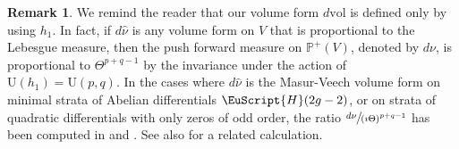 \documentclass[JEP,XML,SOM,Unicode]{cedram}
\let\mathcal\EuScript
\theoremstyle{plain}
\theoremstyle{definition}
\newtheorem{Remark}[Theorem]{Remark}
\newcommand{\Pb}{\mathbb{P}}
\newcommand{\cH}{\mathcal{H}}
\newcommand{\vol}{\mathrm{vol}}
\newcommand{\Ur}{\mathrm{U}}
\begin{document}
\begin{Remark}\label{rk:push:meas:n:curvature}
We remind the reader that our volume form $d\vol$ is defined only by using $h_1$.
In fact, if $d\hat{\nu}$ is any volume form on $V$ that is proportional to the Lebesgue measure, then the push forward measure on $\Pb^+(V)$, denoted by $d\nu$, is proportional to $\Theta^{p+q-1}$ by the invariance under the action of $\Ur(h_1)=\Ur(p,q)$.
In the cases where $d\hat{\nu}$ is the Masur-Veech volume form on minimal strata of Abelian differentials $\cH(2g-2)$, or on strata of quadratic differentials with only zeros of odd order, the ratio $\sfrac{d\nu}{(\imath\Theta)^{p+q-1}}$ has been computed in \cite{Sau18} and \cite{CMS19}.
See also \cite[Lem.\,5.1]{Sau20} for a related calculation.
\end{Remark}
\end{document}

